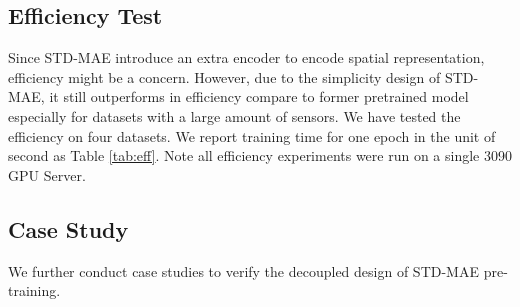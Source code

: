 \documentclass[letterpaper]{article} \usepackage{aaai24}  \usepackage{times}  \usepackage{helvet}  \usepackage{courier}  \usepackage[hyphens]{url}  \usepackage{graphicx} \urlstyle{rm} \def\UrlFont{\rm}  \usepackage{natbib}  \usepackage{caption} \frenchspacing  \setlength{\pdfpagewidth}{8.5in} \setlength{\pdfpageheight}{11in} \usepackage{algorithm}
\begin{document}
\subsection{Efficiency Test}
Since STD-MAE introduce an extra encoder to encode spatial representation, efficiency might be a concern. However, due to the simplicity design of STD-MAE, it still outperforms in efficiency  compare to former pretrained model especially for datasets with a large amount of sensors. We have tested the efficiency on four datasets. We report training time for one epoch in the unit of second as Table \ref{tab:eff}. Note all efficiency experiments were run on a single 3090 GPU Server. 
\begin{table}[h]
    \renewcommand\arraystretch{1.2}
    \footnotesize
\captionsetup{justification=centering}
		\caption{Efficiency Test with Pre-training Model}
		\label{tab:eff}
\end{table}

\subsection{Case Study}
We further conduct case studies to verify the decoupled design of STD-MAE pre-training.
\end{document}
